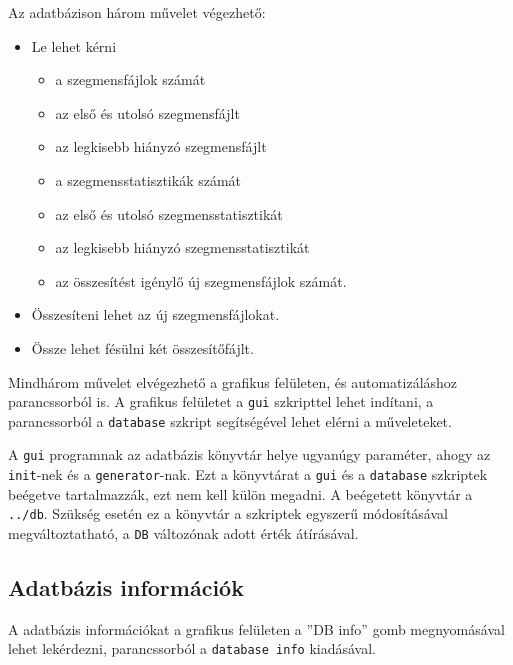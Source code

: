 Az adatbázison három művelet végezhető:
\begin{itemize}

\item Le lehet kérni
\begin{itemize}
\item a szegmensfájlok számát
\item az első és utolsó szegmensfájlt
\item az legkisebb hiányzó szegmensfájlt
\item a szegmensstatisztikák számát
\item az első és utolsó szegmensstatisztikát
\item az legkisebb hiányzó szegmensstatisztikát
\item az összesítést igénylő új szegmensfájlok számát.
\end{itemize}

\item Összesíteni lehet az új szegmensfájlokat.

\item Össze lehet fésülni két összesítőfájlt.

\end{itemize}

Mindhárom művelet elvégezhető a grafikus felületen, és automatizáláshoz parancssorból is.
A grafikus felületet a \texttt{gui} szkripttel lehet indítani, a parancssorból a \texttt{database} szkript segítségével lehet elérni a műveleteket.

A \texttt{gui} programnak az adatbázis könyvtár helye ugyanúgy paraméter, ahogy az \texttt{init}-nek és a \texttt{generator}-nak. Ezt a könyvtárat a \texttt{gui} és a \texttt{database} szkriptek beégetve tartalmazzák, ezt nem kell külön megadni.
A beégetett könyvtár a \texttt{../db}.
Szükség esetén ez a könyvtár a szkriptek egyszerű módosításával megváltoztatható, a \texttt{DB} változónak adott érték átírásával.

\subsection{Adatbázis információk}

A adatbázis információkat a grafikus felületen a ''DB info'' gomb megnyomásával lehet
lekérdezni, parancssorból a \texttt{database info} kiadásával.

